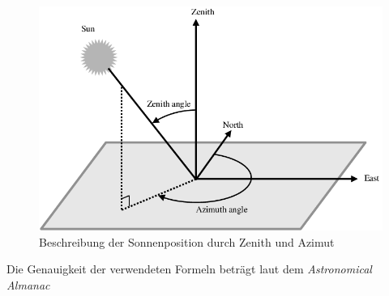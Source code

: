 \begin{figure}[H]
  \centering
  \includegraphics[width=\textwidth]{./img/Representation-of-azimuth-and-zenith-angles.png}
  \caption{Beschreibung der Sonnenposition durch Zenith und Azimut~\cite{Nou2016}}\label{fig:zen_azi}
\end{figure}

Die Genauigkeit der verwendeten Formeln beträgt laut dem \emph{Astronomical Almanac} 


